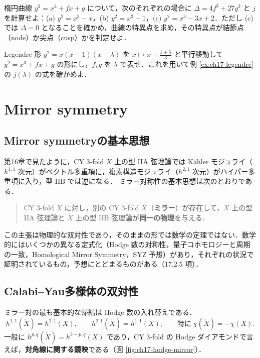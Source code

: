 楕円曲線 $y^2=x^3+fx+g$ について，次のそれぞれの場合に $\Delta=4f^3+27g^2$ と $j$ を計算せよ：(a) $y^2=x^3-x$，(b) $y^2=x^3+1$，(c) $y^2=x^3-3x+2$．ただし (c) では $\Delta=0$ となることを確かめ，曲線の特異点を求め，その特異点が結節点（node）か尖点（cusp）かを判定せよ．

Legendre 形 $y^2=x(x-1)(x-\lambda)$ を $x\mapsto x+\frac{1+\lambda}{3}$ と平行移動して $y^2=x^3+fx+g$ の形にし，$f,g$ を $\lambda$ で表せ．これを用いて例 \ref{ex:ch17-legendre} の $j(\lambda)$ の式を確かめよ．

\section{Mirror symmetry}

\subsection{Mirror symmetryの基本思想}

第16章で見たように，CY 3-fold $X$ 上の型 IIA 弦理論では K\"ahler モジュライ（$h^{1,1}$ 次元）がベクトル多重項に，複素構造モジュライ（$h^{2,1}$ 次元）がハイパー多重項に入り，型 IIB では逆になる．
ミラー対称性の基本思想は次のとおりである．

\begin{quote}
CY 3-fold $X$ に対し，別の CY 3-fold $\check X$（\textbf{ミラー}）が存在して，$X$ 上の型 IIA 弦理論と $\check X$ 上の型 IIB 弦理論が\textbf{同一の物理}を与える．
\end{quote}

この主張は物理的な双対性であり，そのままの形では数学の定理ではない．数学的にはいくつかの異なる定式化（Hodge 数の対称性，量子コホモロジーと周期の一致，Homological Mirror Symmetry，SYZ 予想）があり，それぞれの状況で証明されているもの，予想にとどまるものがある（17.2.5 項）．

\subsection{Calabi--Yau多様体の双対性}

ミラー対の最も基本的な帰結は Hodge 数の入れ替えである．
\begin{equation}
h^{1,1}(\check X)=h^{2,1}(X),\qquad h^{2,1}(\check X)=h^{1,1}(X),\qquad\text{特に}\ \chi(\check X)=-\chi(X).
\label{eq:ch17-mirror-hodge}
\end{equation}
一般に $h^{p,q}(\check X)=h^{3-p,q}(X)$ であり，CY 3-fold の Hodge ダイアモンドで言えば，\textbf{対角線に関する鏡映}である（図 \ref{fig:ch17-hodge-mirror}）．

